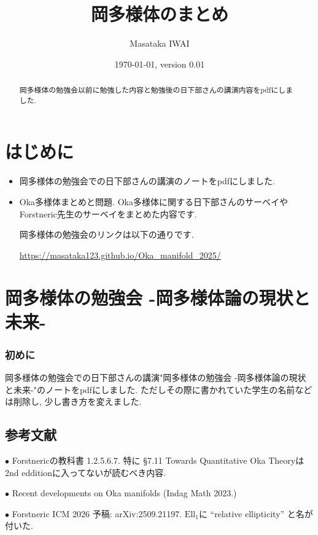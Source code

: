 \documentclass[dvipdfmx,a4paper,11pt]{article} %
\title{岡多様体のまとめ}
\author{Masataka IWAI}
\date{\today, version 0.01}
\theoremstyle{definition}
\theoremstyle{remark}
\numberwithin{equation}{section}
\begin{document}
\maketitle
%
\begin{abstract}
岡多様体の勉強会以前に勉強した内容と勉強後の日下部さんの講演内容をpdfにしました. 
\end{abstract}
%
\setcounter{tocdepth}{3}
\tableofcontents

\section*{はじめに}
\begin{itemize}
\item 岡多様体の勉強会での日下部さんの講演のノートをpdfにしました.
\item Oka多様体まとめと問題. Oka多様体に関する日下部さんのサーベイやForstneric先生のサーベイをまとめた内容です. 

岡多様体の勉強会のリンクは以下の通りです.

\begin{center}
\url{https://masataka123.github.io/Oka_manifold_2025/}
\end{center}

\end{itemize}

\newpage

\section{岡多様体の勉強会 -岡多様体論の現状と未来-}
\subsubsection*{初めに}
岡多様体の勉強会での日下部さんの講演"岡多様体の勉強会 -岡多様体論の現状と未来-"のノートをpdfにしました. ただしその際に書かれていた学生の名前などは削除し, 少し書き方を変えました. 

\subsection{参考文献}

$\bullet$ Forstnericの教科書  1.2.5.6.7. 特に §7.11 Towards Quantitative Oka Theoryは2nd edditionに入ってないが読むべき内容. 

$\bullet$ Recent developments on Oka manifolds (Indag Math 2023.)

$\bullet$ Forstneric ICM 2026 予稿: arXiv:2509.21197.
$\mathrm{Ell}_1$に ``relative ellipticity'' と名が付いた.
\end{document}
